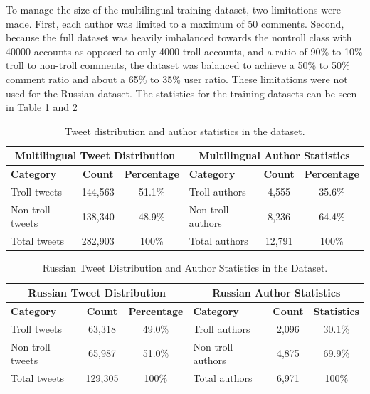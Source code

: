 \documentclass[twoside]{ctuthesis}
\theoremstyle{plain}
\theoremstyle{definition}
\theoremstyle{note}
\begin{document}
To manage the size of the multilingual training dataset, two limitations were made. First, each author was limited to a maximum of 50 comments. Second, because the full dataset was heavily imbalanced towards the nontroll class with 40000 accounts as opposed to only 4000 troll accounts, and a ratio of 90\% to 10\% troll to non-troll comments, the dataset was balanced to achieve a 50\% to 50\% comment ratio and about a 65\% to 35\% user ratio. These limitations were not used for the Russian dataset. The statistics for the training datasets can be seen in Table \ref{tab:mult_statistics} and \ref{tab:russian_statistics}\par
\begin{table}[ht]
    \centering
    \caption{Tweet distribution and author statistics in the dataset.}
    \label{tab:mult_statistics}
    \begin{tabular}{lcc|lcc}
        \toprule
        \multicolumn{3}{c|}{\textbf{Multilingual Tweet Distribution}} & \multicolumn{3}{c}{\textbf{Multilingual Author Statistics}} \\
        \midrule
        \textbf{Category} & \textbf{Count} & \textbf{Percentage} & \textbf{Category} & \textbf{Count} & \textbf{Percentage} \\
        \midrule
        Troll tweets     & 144,563 & 51.1\% & Troll authors     & 4,555 & 35.6\% \\
        Non-troll tweets & 138,340 & 48.9\% & Non-troll authors & 8,236 & 64.4\% \\
        \midrule
        Total tweets     & 282,903 & 100\% & Total authors & 12,791 & 100\% \\
        \bottomrule
    \end{tabular}
\end{table}


\begin{table}[ht]
    \centering
    \caption{Russian Tweet Distribution and Author Statistics in the Dataset.}
    \label{tab:russian_statistics}
    \begin{tabular}{lcc|lcc}
        \toprule
        \multicolumn{3}{c|}{\textbf{Russian Tweet Distribution}} & \multicolumn{3}{c}{\textbf{Russian Author Statistics}} \\
        \midrule
        \textbf{Category} & \textbf{Count} & \textbf{Percentage} & \textbf{Category} & \textbf{Count} & \textbf{Statistics} \\
        \midrule
        Troll tweets     & 63,318 & 49.0\% & Troll authors     & 2,096 & 30.1\% \\
        Non-troll tweets & 65,987 & 51.0\% & Non-troll authors & 4,875 & 69.9\% \\
        \midrule
        Total tweets     & 129,305 & 100\% & Total authors & 6,971 & 100\% \\
        \bottomrule
    \end{tabular}
\end{table}
\end{document}
